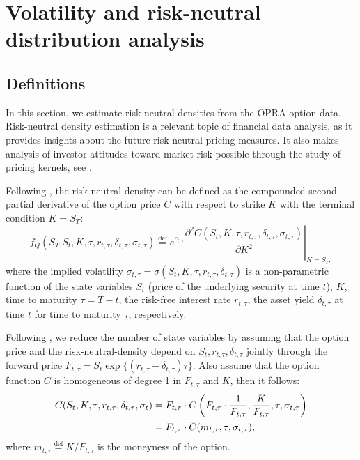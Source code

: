 \documentclass[a4paper,12pt]{article}
\theoremstyle{plain}
\theoremstyle{definition}
\begin{document}
\restoregeometry
\section{Volatility and risk-neutral distribution analysis}
\subsection{Definitions}
In this section, we estimate risk-neutral densities from the OPRA option data. Risk-neutral density estimation is a relevant topic of financial data analysis, as it provides insights about the future risk-neutral pricing measures. It also makes analysis of investor attitudes toward market risk possible through the study of pricing kernels, see \citet{ait_sahalia_lo_2}. 

Following \citet{breeden_litz}, the risk-neutral density can be defined as the compounded second partial derivative of the option price $C$ with respect to strike $K$ with the terminal condition $K = S_T$:
\begin{equation}
f_Q(S_T | S_t, K, \tau, r_{t,\tau}, \delta_{t,\tau}, \sigma_{t,\tau}) \stackrel{\operatorname{def}}{=} \left. e^{r_{t,\tau}} \frac{ \partial^2 C(S_t, K, \tau, r_{t,\tau}, \delta_{t,\tau}, \sigma_{t,\tau}) }{\partial K^2} \right|_{K = S_T,}
\label{rnd_def}
\end{equation}
where the implied volatility $\sigma_{t,\tau} = \sigma(S_t, K, \tau, r_{t,\tau}, \delta_{t,\tau})$ is a non-parametric function of the state variables $S_t$ (price of the underlying security at time $t$), $K$, time to maturity $\tau = T-t$, the risk-free interest rate $r_{t,\tau}$, the asset yield $\delta_{t,\tau}$ at time $t$ for time to maturity $\tau$, respectively.

Following \citet{ait_sahalia_lo_1}, we reduce the number of state variables by assuming that the option price and the risk-neutral-density depend on $S_t, r_{t,\tau}, \delta_{t,\tau}$ jointly through the forward price $F_{t,\tau} = S_t \exp\{ (r_{t,\tau} - \delta_{t,\tau})\tau \}$. Also assume that the option function $C$ is homogeneous of degree 1 in $F_{t,\tau}$ and $K$, then it follows:
\begin{align}
C(S_t, K, \tau, r_{t,\tau}, \delta_{t,\tau}, \sigma_t) &= F_{t,\tau} \cdot C \left(F_{t,\tau} \cdot \frac{1}{F_{t,\tau}}, \frac{K}{F_{t,\tau}}, \tau, \sigma_{t,\tau} \right) \notag \\ 
{}                 &= F_{t,\tau} \cdot \overline{C}(m_{t,\tau}, \tau, \sigma_{t,\tau}),
\label{regr_reduc}
\end{align}
where $m_{t,\tau} \stackrel{\operatorname{def}}{=} K/F_{t,\tau}$ is the moneyness of the option. 
\end{document}

